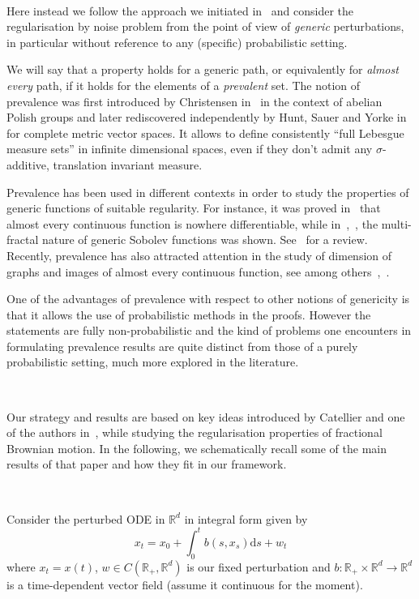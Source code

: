 \documentclass[10pt]{article}
\newcommand{\mathd}{\mathrm{d}}
\newcommand{\tmtextit}[1]{{\itshape{#1}}}
\begin{document}
\

Here instead we follow the approach we initiated
in~{\cite{galeatigubinelli_ode}} and consider the regularisation by noise
problem from the point of view of \tmtextit{generic} perturbations, in
particular without reference to any (specific) probabilistic setting.

We will say that a property holds for a generic path, or equivalently for
\tmtextit{almost every} path, if it holds for the elements of a
\tmtextit{prevalent} set. The notion of prevalence was first introduced by
Christensen in~{\cite{christensen}} in the context of abelian Polish groups
and later rediscovered independently by Hunt, Sauer and Yorke
in~{\cite{huntsauer}} for complete metric vector spaces. It allows to define
consistently ``full Lebesgue measure sets'' in infinite dimensional spaces,
even if they don't admit any $\sigma$-additive, translation invariant measure.

Prevalence has been used in different contexts in order to study the
properties of generic functions of suitable regularity. For instance, it was
proved in~{\cite{hunt}} that almost every continuous function is nowhere
differentiable, while in~{\cite{fraysse2010}},~{\cite{fraysse2006}}, the
multi-fractal nature of generic Sobolev functions was shown. See~{\cite{ott}}
for a review. Recently, prevalence has also attracted attention in the study
of dimension of graphs and images of almost every continuous function, see
among others~{\cite{fraserhyde}},~{\cite{bayart}}.

One of the advantages of prevalence with respect to other notions of
genericity is that it allows the use of probabilistic methods in the proofs.
However the statements are fully non-probabilistic and the kind of problems
one encounters in formulating prevalence results are quite distinct from those
of a purely probabilistic setting, much more explored in the literature.

\

Our strategy and results are based on key ideas introduced by Catellier and
one of the authors in~{\cite{catelliergubinelli}}, while studying the
regularisation properties of fractional Brownian motion. In the following, we
schematically recall some of the main results of that paper and how they fit
in our framework.

\

Consider the perturbed ODE in $\mathbb{R}^d$ in integral form given by
\begin{equation}
  \label{eq:pert-ode} x_t = x_0 + \int_0^t b (s, x_s) \mathd s + w_t
\end{equation}
where $x_t = x (t)$, $w \in C (\mathbb{R}_+, \mathbb{R}^d)$ is our fixed
perturbation and $b : \mathbb{R}_+ \times \mathbb{R}^d \rightarrow
\mathbb{R}^d$ is a time-dependent vector field (assume it continuous for the
moment).
\end{document}
